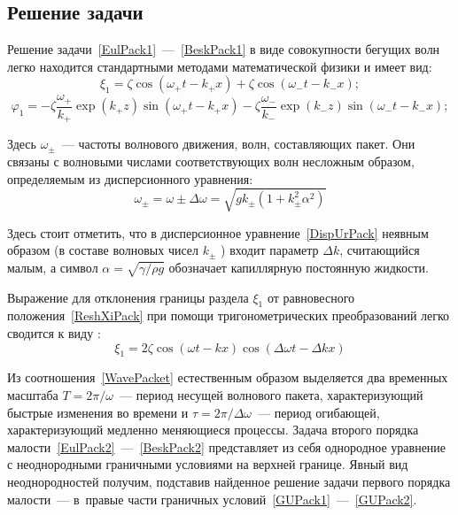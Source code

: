 \subsection{Решение задачи}

Решение задачи~\eqref{EulPack1}~---~\eqref{BeskPack1}  в виде совокупности бегущих волн легко находится стандартными методами математической физики и имеет вид:
\begin{equation}
\xi_{1}=\zeta \cos \left( \omega_{+} t - k_{+} x \right) + \zeta \cos \left( \omega_{-} t - k_{-} x \right);
\label{ReshXiPack}
\end{equation}
\begin{equation}
\varphi_{1}=-\zeta \dfrac{\omega_{+}}{k_{+}}\exp \left( k_{+} z\right) \sin \left( \omega_{+} t- k_{+} x \right) -\zeta \dfrac{\omega_{-}}{k_{-}}\exp \left( k_{-} z\right) \sin \left( \omega_{-} t- k_{-} x \right); 
\label{ReshPhiPack}
\end{equation}
	 
Здесь $ \omega_{\pm} $~--- частоты волнового движения, волн, составляющих пакет. Они связаны с волновыми числами соответствующих волн несложным образом, определяемым из дисперсионного уравнения:
\begin{equation}
\omega_{\pm}=\omega \pm \Delta \omega = \sqrt{g k _{\pm} \left( 1+ k_{\pm}^{2} \alpha^{2} \right)}
\label{DispUrPack}
\end{equation}
	  	
Здесь стоит отметить, что в дисперсионное уравнение~\eqref{DispUrPack} неявным образом (в составе волновых чисел $ k_{\pm} $ ) входит параметр $ \Delta k $, считающийся малым, а символ $ \alpha= \sqrt{\gamma/\rho g} $  обозначает капиллярную постоянную жидкости. 

Выражение для отклонения границы раздела $ \xi_{1} $ от равновесного положения~\eqref{ReshXiPack} при помощи тригонометрических преобразований легко сводится к виду \parencite{Ostrovsky}:
\begin{equation}
\xi_{1}=2\zeta \cos \left( \omega t - k x \right) \cos \left( \Delta \omega t - \Delta k x \right)
\label{WavePacket}  
\end{equation}
	  	
Из соотношения~\eqref{WavePacket} естественным образом выделяется два временных масштаба $ T=2\pi/\omega $~--- период несущей волнового пакета, характеризующий быстрые изменения во времени и $ \tau=2\pi/\Delta \omega $~--- период огибающей, характеризующий медленно меняющиеся процессы. 
Задача второго порядка малости~\eqref{EulPack2}~---~\eqref{BeskPack2}  представляет из себя однородное уравнение с неоднородными граничными условиями на верхней границе. Явный вид неоднородностей получим, подставив найденное решение задачи первого порядка малости~---  в~правые части граничных условий~\eqref{GUPack1}~---~\eqref{GUPack2}.
 
